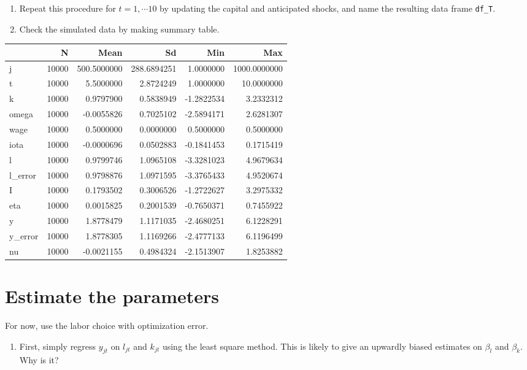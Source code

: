 \documentclass[
]{book}
\providecommand{\tightlist}{%
  \setlength{\itemsep}{0pt}\setlength{\parskip}{0pt}}
\begin{document}
\begin{enumerate}
\def\labelenumi{\arabic{enumi}.}
\setcounter{enumi}{8}
\item
  Repeat this procedure for \(t = 1, \cdots 10\) by updating the capital and anticipated shocks, and name the resulting data frame \texttt{df\_T}.
\item
  Check the simulated data by making summary table.
\end{enumerate}

\begin{tabular}{l|r|r|r|r|r}
\hline
  & N & Mean & Sd & Min & Max\\
\hline
j & 10000 & 500.5000000 & 288.6894251 & 1.0000000 & 1000.0000000\\
\hline
t & 10000 & 5.5000000 & 2.8724249 & 1.0000000 & 10.0000000\\
\hline
k & 10000 & 0.9797900 & 0.5838949 & -1.2822534 & 3.2332312\\
\hline
omega & 10000 & -0.0055826 & 0.7025102 & -2.5894171 & 2.6281307\\
\hline
wage & 10000 & 0.5000000 & 0.0000000 & 0.5000000 & 0.5000000\\
\hline
iota & 10000 & -0.0000696 & 0.0502883 & -0.1841453 & 0.1715419\\
\hline
l & 10000 & 0.9799746 & 1.0965108 & -3.3281023 & 4.9679634\\
\hline
l\_error & 10000 & 0.9798876 & 1.0971595 & -3.3765433 & 4.9520674\\
\hline
I & 10000 & 0.1793502 & 0.3006526 & -1.2722627 & 3.2975332\\
\hline
eta & 10000 & 0.0015825 & 0.2001539 & -0.7650371 & 0.7455922\\
\hline
y & 10000 & 1.8778479 & 1.1171035 & -2.4680251 & 6.1228291\\
\hline
y\_error & 10000 & 1.8778305 & 1.1169266 & -2.4777133 & 6.1196499\\
\hline
nu & 10000 & -0.0021155 & 0.4984324 & -2.1513907 & 1.8253882\\
\hline
\end{tabular}

\hypertarget{estimate-the-parameters}{%
\section{Estimate the parameters}\label{estimate-the-parameters}}

For now, use the labor choice with optimization error.

\begin{enumerate}
\def\labelenumi{\arabic{enumi}.}
\tightlist
\item
  First, simply regress \(y_{jt}\) on \(l_{jt}\) and \(k_{jt}\) using the least square method. This is likely to give an upwardly biased estimates on \(\beta_l\) and \(\beta_k\). Why is it?
\end{enumerate}
\end{document}
